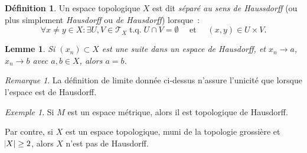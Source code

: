 \documentclass{report}
\newtheorem{lem}[thm]{Lemme}
\theoremstyle{definition}
\newtheorem{déf}[thm]{Définition}
\theoremstyle{remark}
\newtheorem*{rmq}{Remarque}
\newtheorem{ex}{Exemple}[chapter]
\DeclareMathOperator{\tq}{\text{ t.q. }}
\renewcommand{\top}{\mathcal T}
\begin{document}
	\begin{déf} Un espace topologique $X$ est dit \textit{séparé au sens de Haussdorff} (ou plus simplement \textit{Hausdorff} ou \textit{de Hausdorff}) lorsque~:
	\[\forall x \neq y \in X : \exists U, V \in \top_X \tq U \cap V = \emptyset \quad \text{ et } \quad (x, y) \in U \times V.\]
	\end{déf}

	\begin{lem} Si $(x_n) \subset X$ est une suite dans un espace de Hausdorff, et $x_n \to a$, $x_n \to b$ avec $a, b \in X$, alors $a = b$.
	\end{lem}

	\begin{rmq} La définition de limite donnée ci-dessus n'assure l'unicité que lorsque l'espace est de Hausdorff.
	\end{rmq}

	\begin{ex} Si $M$ est un espace métrique, alors il est topologique de Hausdorff.

	Par contre, si $X$ est un espace topologique, muni de la topologie grossière et $\abs X \geq 2$, alors $X$ n'est pas de Hausdorff.
	\end{ex}
\end{document}
